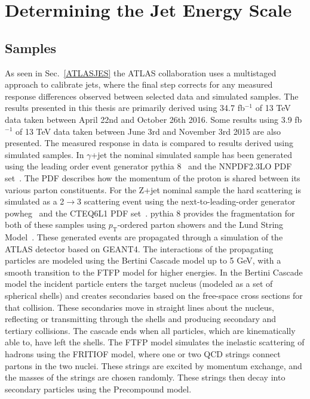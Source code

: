 \chapter{Determining the Jet Energy Scale}
\label{JES2}

\section{Samples}
As seen in Sec.~\ref{ATLASJES} the ATLAS collaboration uses a multistaged approach to calibrate jets, where the final step corrects for any measured response differences observed between selected data and simulated samples.  
The results presented in this thesis are primarily derived using 34.7 fb$^{-1}$ of 13 TeV data taken between April 22nd and October 26th 2016. 
Some results using 3.9 fb$^{-1}$ of 13 TeV data taken between June 3rd and November 3rd 2015 are also presented.  
The measured response in data is compared to results derived using simulated samples.  
In $\gamma$+jet the nominal simulated sample has been generated using the leading order event generator {\sc pythia} 8~\cite{Sjostrand:2007gs} and the NNPDF2.3LO \gls{PDF} set~\cite{Ball:2013hta}.  
The PDF describes how the momentum of the proton is shared between its various parton constituents.  
For the Z+jet nominal sample the hard scattering is simulated as a 2$\rightarrow$3 scattering event using the next-to-leading-order generator {\sc powheg}~\cite{Nason:2004rx, Frixione:2007vw, Alioli:2010xd} and the CTEQ6L1 PDF set~\cite{Pumplin:2002vw}.   
{\sc pythia} 8 provides the fragmentation for both of these samples using $p_{\mathrm T}$-ordered parton showers and the Lund String Model~\cite{ANDERSSON198331}.  
These generated events are propagated through a simulation of the ATLAS detector based on GEANT4.  
The interactions of the propagating particles are modeled using the Bertini Cascade model up to 5 GeV, with a smooth transition to the FTFP model for higher energies.  
In the Bertini Cascade model the incident particle enters the target nucleus (modeled as a set of spherical shells) and creates secondaries based on the free-space cross sections for that collision.  
These secondaries move in straight lines about the nucleus, reflecting or transmitting through the shells and producing secondary and tertiary collisions.  
The cascade ends when all particles, which are kinematically able to, have left the shells.  
The FTFP model simulates the inelastic scattering of hadrons using the FRITIOF model, where one or two QCD strings connect partons in the two nuclei.  
These strings are excited by momentum exchange, and the masses of the strings are chosen randomly.  
These strings then decay into secondary particles using the Precompound model.  
 



